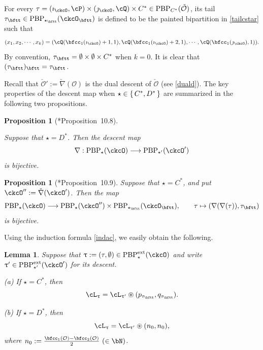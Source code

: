 \documentclass[11pt,a4paper]{amsart}
\newcommand{\CO}{{\mathcal {O}}}
\def\DD{\nabla}
\numberwithin{equation}{section}
\newtheorem{lem}[thm]{Lemma}
\newtheorem{prop}[thm]{Proposition}
\theoremstyle{remark}
\def\PBPes{\mathrm{PBP}^{\mathrm{ext}}_{\star}}
\def\PBPesp{\mathrm{PBP}^{\mathrm{ext}}_{\star'}}
\def\ckcOp{\ckcO^{\prime}}
\def\ckcOpp{\ckcO^{\prime\prime}}
\def\ckDD{{\check\DD}}
\def\PBP{\mathrm{PBP}}
\def\ac{\cL}
\begin{document}
\medskip

For every $\tau=(\imath_\ckcO,\cP)\times(\jmath_\ckcO,\cQ)\times C^* \in
\mathrm{PBP}_{C^*}(\check \CO) $, its tail $\tau_\bftt\in\PBP_{\star_\bftt}(\ckcO_\bftt) $  is defined to be the painted bipartition in
 \eqref{tailcstar} such that
\[
  (x_1, x_2, \cdots, x_k)= (\cQ(\bfcc_{1}(\imath_\ckcO)+1,1),\cQ(\bfcc_{1}(\imath_\ckcO)+2,1),\cdots, \cQ(\bfcc_{1}(\jmath_\ckcO),1)).
\]
By convention, $\tau_\bftt=\emptyset\times \emptyset \times C^*$ when $k=0$. 
It is clear that $(\tau_\bftt)_\bftt=\tau_\bftt$.

 

Recall that $\check \CO':=\check \nabla(\CO)$ is the dual descent of $\check \CO$ (see \eqref{duald}).  The key properties of the descent map 
when $\star\in \set{C^*,D^*}$ 
are summarized in the following two propositions.

\begin{prop}[{\cite{BMSZa}*{Proposition~10.8}}]\label{prop:CC.bijq}

Suppose that $\star =D^*$. Then   the descent map
\begin{equation}\label{eq:DD.CCq}
\nabla: \PBP_\star(\ckcO)\longrightarrow  \PBP_{\star'}(\ckcOp)
\end{equation}
 is bijective.

\end{prop}


\begin{prop}[{\cite{BMSZa}*{Proposition~10.9}}]
\label{lem:deltaq}
Suppose that $\star =C^*$, and put  $\ckcOpp := \ckDD(\ckcO')$.  Then the map
\[
  \PBP_\star(\ckcO)\longrightarrow
    \PBP_\star(\ckcOpp)\times \PBP_{\star_\bftt}(\ckcO_\bftt),
    \qquad \tau \mapsto (\DD(\DD(\tau)),\tau_\bftt)
\]
is bijective. 

\end{prop}

Using the induction formula \eqref{indac}, we easily obtain the following. 

\begin{lem}\label{indcdstar}
Suppose that $\uptau:=(\tau,\emptyset)\in \PBPes(\ckcO)$ and write $\uptau'\in \PBPesp(\ckcO')$ for its descent. 

 \noindent (a) 
  If $\star = C^{*}$, then
  \[
    \ac_{\uptau}=\ac_{\uptau'} \circledast  (p_{\tau_{\bftt}},q_{\tau_{\bftt}}).
\]

\noindent (b) 
If $\star = D^{*}$, then
  \[
    \ac_{\uptau}=\ac_{\uptau'} \circledast (n_{0},n_{0}),
  \]
  where $n_0:=\frac{\bfcc_1(\CO)-\bfcc_2(\CO)}{2}\  (\in \bN)$. 
\end{lem}
\end{document}
